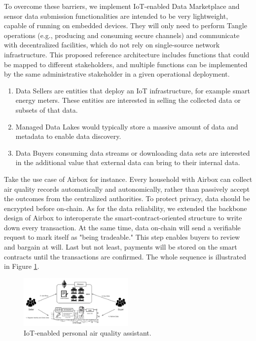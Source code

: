 \documentclass[journal,10pt,a4paper]{IEEEtran}
\begin{document}
To overcome these barriers, we implement IoT-enabled Data Marketplace and sensor data submission functionalities are intended to be very lightweight, capable of running on embedded devices. They will only need to perform Tangle operations (e.g., producing and consuming secure channels) and communicate with decentralized facilities, which do not rely on single-source network infrastructure. This proposed reference architecture includes functions that could be mapped to different stakeholders, and multiple functions can be implemented by the same administrative stakeholder in a given operational deployment.
\begin{enumerate}
    \item Data Sellers are entities that deploy an IoT infrastructure, for example smart energy meters. These entities are interested in selling the collected data or subsets of that data.
    \item Managed Data Lakes would typically store a massive amount of data and metadata to enable data discovery.
    \item Data Buyers consuming data streams or downloading data sets are interested in the additional value that external data can bring to their internal data.
\end{enumerate}

Take the use case of Airbox\cite{LASS} for instance. Every household with Airbox can collect air quality records automatically and autonomically, rather than passively accept the outcomes from the centralized authorities. To protect privacy, data should be encrypted before on-chain. As for the data reliability, we extended the backbone design of Airbox to interoperate the smart-contract-oriented structure to write down every transaction. At the same time, data on-chain will send a verifiable request to mark itself as "being tradeable." This step enables buyers to review and bargain at will. Last but not least, payments will be stored on the smart contracts until the transactions are confirmed. The whole sequence is illustrated in Figure \ref{fig:airbox}.

\begin{figure}[h]
    \centering
    \includegraphics[width=0.5\textwidth]{airbox}
    \caption{IoT-enabled personal air quality assistant.}
    \label{fig:airbox}
\end{figure}
\end{document}
